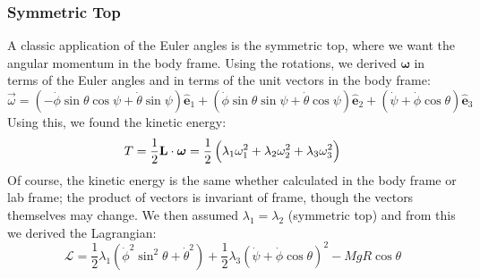 \documentclass[../PHYS306Notes.tex]{subfiles}
\begin{document}
\subsubsection{Symmetric Top}
A classic application of the Euler angles is the symmetric top, where we want the angular momentum in the body frame. Using the rotations, we derived $\bm{\omega}$ in terms of the Euler angles and in terms of the unit vectors in the body frame:
\[
\vec{\omega}=(-\dot{\phi} \sin \theta \cos \psi+\dot{\theta} \sin \psi) \hat{\mathbf{e}}_{1}+(\dot{\phi} \sin \theta \sin \psi+\dot{\theta} \cos \psi) \hat{\mathbf{e}}_{2}+(\dot{\psi}+\dot{\phi} \cos \theta) \hat{\mathbf{e}}_{3}
\]
Using this, we found the kinetic energy:
\[
T=\frac{1}{2} \mathbf{L} \cdot \bm{\omega}=\frac{1}{2}\left(\lambda_{1} \omega_{1}^{2}+\lambda_{2} \omega_{2}^{2}+\lambda_{3} \omega_{3}^{2}\right)
\]
Of course, the kinetic energy is the same whether calculated in the body frame or lab frame; the product of vectors is invariant of frame, though the vectors themselves may change. We then assumed $\lambda_1 = \lambda_2$ (symmetric top) and from this we derived the Lagrangian:
\[
\mathcal{L}=\frac{1}{2} \lambda_{1}\left(\dot{\phi}^{2} \sin ^{2} \theta+\dot{\theta}^{2}\right)+\frac{1}{2} \lambda_{3}(\dot{\psi}+\dot{\phi} \cos \theta)^{2}-M g R \cos \theta
\]
\end{document}
